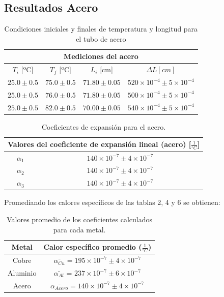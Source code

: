 \documentclass[a4paper]{article}
\begin{document}
\subsection*{Resultados Acero}
\begin{table}[H]
    \centering
    \begin{tabular}{|c|c|c|c|}\hline
    \multicolumn{4}{|c|}{\textbf{Mediciones del acero}} \\ \hline
    $T_{i}$ [ºC] & $T_{f}$ [ºC] & $L_{i}$ [cm] & $\Delta L [cm]$\\ \hline
      $25.0\pm 0.5$ & $75.0\pm 0.5$ & $71.80\pm 0.05$ & $520\times10^{-4}\pm5\times10^{-4}$\\ \hline
      $25.0\pm 0.5$ & $76.0\pm 0.5$ & $71.80\pm 0.05$ & $500\times10^{-4}\pm5\times10^{-4}$\\ \hline
      $25.0\pm 0.5$ & $82.0\pm 0.5$ & $70.00\pm 0.05$ & $540\times10^{-4}\pm5\times10^{-4}$\\ \hline
    \end{tabular}
    \caption{Condiciones iniciales y finales de temperatura y longitud para el tubo de acero}
    \label{Tabla 3}
\end{table}

\begin{table}[H]
    \centering
    \begin{tabular}{|c|c|} \hline
        \multicolumn{2}{|c|}{Valores del coeficiente de expansión lineal (acero) [$\frac{1}{^{\circ}C}$]} \\ \hline
         $\alpha_{1}$ & $140\times 10^{-7}\pm 4\times10^{-7}$ \\ \hline
         $\alpha_{2}$ & $140 \times 10^{-7}\pm 4\times10^{-7}$ \\ \hline
         $\alpha_{3}$ & $140 \times 10^{-7}\pm 4\times10^{-7}$ \\ \hline

    \end{tabular}
    \caption{Coeficientes de expansión para el acero.}
    \label{Tabla 1.1}
\end{table}

Promediando los calores específicos de las tablas 2, 4 y 6 se obtienen:

\begin{table}[H]
    \centering
    \begin{tabular}{|c||c|} \hline
        \textbf{Metal} & \textbf{Calor específico promedio ($\frac{1}{^{\circ}C}$)} \\ \hline
        Cobre & $\bar{\alpha_{Cu}} = 195\times 10^{-7} \pm 4\times10^{-7}$\\ \hline
        Aluminio & $\bar{\alpha_{Al}}$ = $237\times 10^{-7} \pm 6\times10^{-7}$ \\ \hline
        Acero  & $\bar{\alpha_{Acero}} = 140\times 10^{-7} \pm 4\times10^{-7}$ \\ \hline
   
    \end{tabular}
     \caption{Valores promedio de los coeficientes calculados para cada metal.}
\end{table}
\end{document}
